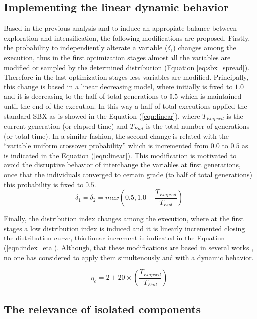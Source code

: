 \subsection{Implementing the linear dynamic behavior}
Based in the previous analysis and to induce an appropiate balance between exploration and intensification, the following modifications are proposed.
%
Firstly, the probability to independiently alterate a variable ($\delta_1$) changes among the execution, thus in the first optimization stages almost all the variables are modified or sampled by the determined distribution (Equation \ref{eq:sbx_spread}).
%
Therefore in the last optimization stages less variables are modified.
%
Principally, this change is based in a linear decreasing model, where initially is fixed to $1.0$ and it is decreasing to the half of total generations to $0.5$ which is maintained until the end of the execution.
%
In this way a half of total executions applied the standard SBX as is showed in the Equation (\ref{eqn:linear}), where $T_{Elapsed}$ is the current generation (or elapsed time) and $T_{End}$ is the total number of generations (or total time).
%
In a similar fashion, the second change is related with the ``variable uniform crossover probability'' which is incremented from $0.0$ to $0.5$ as is indicated in the Equation (\ref{eqn:linear}).
%
This modification is motivated to avoid the disruptive behavior of interchange the variables at first generations, once that the individuals converged to certain grade (to half of total generations) this probability is fixed to $0.5$.
\begin{equation}\label{eqn:linear}
	\delta_1 = \delta_2 = max \left (0.5, 1.0 - \frac{T_{Elapsed}}{T_{End}} \right )
\end{equation}

%
Finally, the distribution index changes among the execution, where at the first stages a low distribution index is induced and it is linearly incremented closing the distribution curve, this linear increment is indicated in the Equation (\ref{eqn:index_eta}).
%
Although, that these modifications are based in several works \cite{zitzler1999multiobjective}, \cite{hamdan2012distribution} no one has considered to apply them simultenously and with a dynamic behavior.
%

\begin{equation}\label{eqn:index_eta}
 \eta_c = 2 + 20 \times \left ( \frac{T_{Elapsed}}{T_{End}} \right)
\end{equation}


\subsection{The relevance of isolated components}

